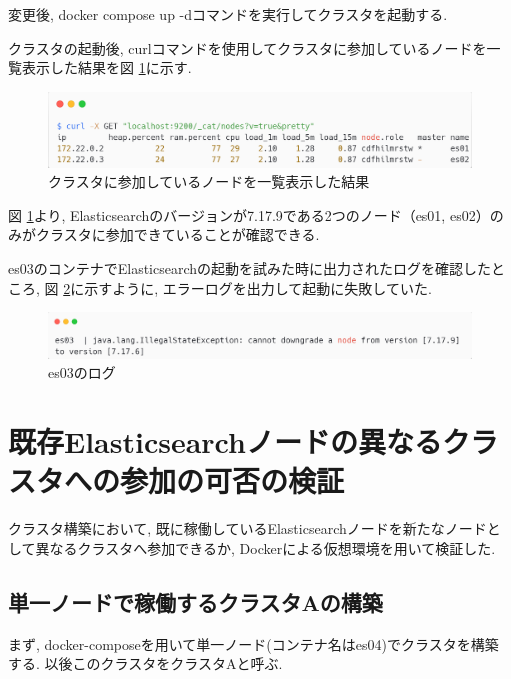 変更後, docker compose up -dコマンドを実行してクラスタを起動する.

クラスタの起動後, curlコマンドを使用してクラスタに参加しているノードを一覧表示した結果を図 \ref{4-p6}に示す.

\begin{figure}[H]
  \begin{center}
    \includegraphics[width=140mm]{sotu/figure/curl-different.png}
    \caption{クラスタに参加しているノードを一覧表示した結果}
    \label{4-p6}
  \end{center}
\end{figure}

図 \ref{4-p6}より, Elasticsearchのバージョンが7.17.9である2つのノード（es01, es02）のみがクラスタに参加できていることが確認できる.

es03のコンテナでElasticsearchの起動を試みた時に出力されたログを確認したところ, 図 \ref{4-p7}に示すように, エラーログを出力して起動に失敗していた.

\begin{figure}[H]
  \begin{center}
    \includegraphics[width=140mm]{sotu/figure/log.png}
    \caption{es03のログ}
    \label{4-p7}
  \end{center}
\end{figure}

\section{既存Elasticsearchノードの異なるクラスタへの参加の可否の検証}
クラスタ構築において, 既に稼働しているElasticsearchノードを新たなノードとして異なるクラスタへ参加できるか, Dockerによる仮想環境を用いて検証した.

\subsection{単一ノードで稼働するクラスタAの構築}

まず, docker-composeを用いて単一ノード(コンテナ名はes04)でクラスタを構築する. 以後このクラスタをクラスタAと呼ぶ.

